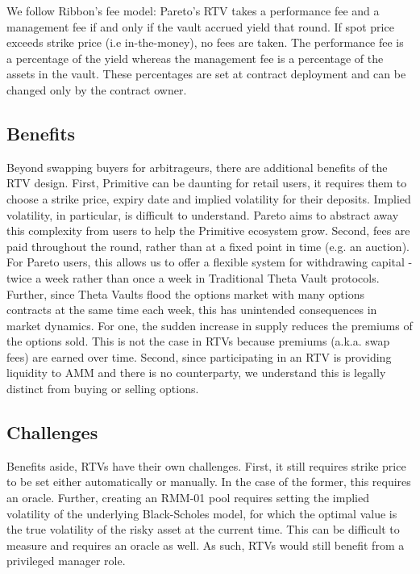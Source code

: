 \documentclass[hidelinks, 12pt]{article}
\begin{document}
We follow Ribbon's fee model: Pareto's RTV takes a performance fee and a management fee if and only if the vault accrued yield that round. If spot price exceeds strike price (i.e in-the-money), no fees are taken. The performance fee is a percentage of the yield whereas the management fee is a percentage of the assets in the vault. These percentages are set at contract deployment and can be changed only by the contract owner.

\subsection{Benefits}

Beyond swapping buyers for arbitrageurs, there are additional benefits of the RTV design. First, Primitive can be daunting for retail users, it requires them to choose a strike price, expiry date and implied volatility for their deposits. Implied volatility, in particular, is difficult to understand. Pareto aims to abstract away this complexity from users to help the Primitive ecosystem grow. Second, fees are paid throughout the round, rather than at a fixed point in time (e.g. an auction). For Pareto users, this allows us to offer a flexible system for withdrawing capital - twice a week rather than once a week in Traditional Theta Vault protocols. Further, since Theta Vaults flood the options market with many options contracts at the same time each week, this has unintended consequences in market dynamics. For one, the sudden increase in supply reduces the premiums of the options sold. This is not the case in RTVs because premiums (a.k.a. swap fees) are earned over time. Second, since participating in an RTV is providing liquidity to AMM and there is no counterparty, we understand this is legally distinct from buying or selling options.

\subsection{Challenges}
\label{Challenges}

Benefits aside, RTVs have their own challenges. First, it still requires strike price to be set either automatically or manually. In the case of the former, this requires an oracle. Further, creating an RMM-01 pool requires setting the implied volatility of the underlying Black-Scholes model, for which the optimal value is the true volatility of the risky asset at the current time. This can be difficult to measure and requires an oracle as well. As such, RTVs would still benefit from a privileged manager role.
\end{document}
